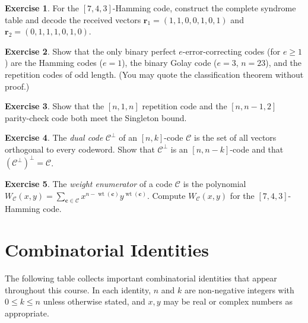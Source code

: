 \documentclass[12pt,a4paper,openany]{book}
\theoremstyle{definition}
\newtheorem{exercise}{Exercise}[chapter]
\theoremstyle{plain}
\theoremstyle{remark}
\begin{document}
\begin{exercise}
\label{exo:syndrome-table}
For the $[7,4,3]$-Hamming code, construct the complete syndrome table
and decode the received vectors $\mathbf{r}_1=(1,1,0,0,1,0,1)$ and
$\mathbf{r}_2=(0,1,1,1,0,1,0)$.
\end{exercise}

\begin{exercise}
\label{exo:perfect-codes}
Show that the only binary perfect $e$-error-correcting codes (for
$e\ge 1$) are the Hamming codes ($e=1$), the binary Golay code
($e=3$, $n=23$), and the repetition codes of odd length.
(You may quote the classification theorem without proof.)
\end{exercise}

\begin{exercise}
\label{exo:singleton-mds}
Show that the $[n,1,n]$ repetition code and the $[n,n-1,2]$ parity-check
code both meet the Singleton bound.
\end{exercise}

\begin{exercise}
\label{exo:dual-code}
The \emph{dual code} $\mathcal{C}^\perp$ of an $[n,k]$-code
$\mathcal{C}$ is the set of all vectors orthogonal to every codeword.
Show that $\mathcal{C}^\perp$ is an $[n,n-k]$-code and that
$(\mathcal{C}^\perp)^\perp=\mathcal{C}$.
\end{exercise}

\begin{exercise}
\label{exo:weight-enumerator}
The \emph{weight enumerator} of a code $\mathcal{C}$ is the polynomial
$W_{\mathcal{C}}(x,y)=\sum_{\mathbf{c}\in\mathcal{C}}
x^{n-\operatorname{wt}(\mathbf{c})}y^{\operatorname{wt}(\mathbf{c})}$.
Compute $W_{\mathcal{C}}(x,y)$ for the $[7,4,3]$-Hamming code.
\end{exercise}



\appendix
\chapter{Combinatorial Identities}
\label{app:comb-identities}

The following table collects important combinatorial identities that
appear throughout this course.  In each identity, $n$ and $k$ are
non-negative integers with $0\le k\le n$ unless otherwise stated, and
$x,y$ may be real or complex numbers as appropriate.
\end{document}
